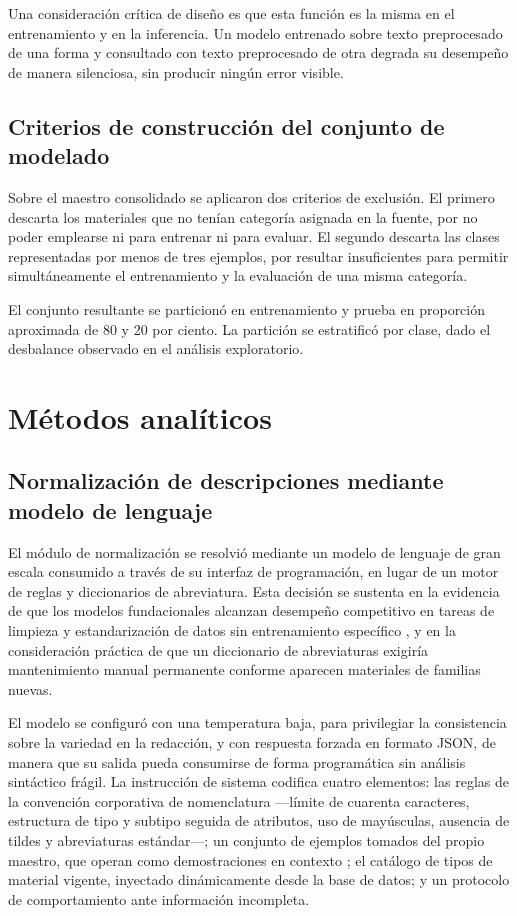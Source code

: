 Una consideración crítica de diseño es que esta función es la misma en el entrenamiento y en la inferencia. Un modelo entrenado sobre texto preprocesado de una forma y consultado con texto preprocesado de otra degrada su desempeño de manera silenciosa, sin producir ningún error visible.

\subsection{Criterios de construcción del conjunto de modelado}
Sobre el maestro consolidado se aplicaron dos criterios de exclusión. El primero descarta los materiales que no tenían categoría asignada en la fuente, por no poder emplearse ni para entrenar ni para evaluar. El segundo descarta las clases representadas por menos de tres ejemplos, por resultar insuficientes para permitir simultáneamente el entrenamiento y la evaluación de una misma categoría.

El conjunto resultante se particionó en entrenamiento y prueba en proporción aproximada de 80 y 20 por ciento. La partición se estratificó por clase, dado el desbalance observado en el análisis exploratorio.

\section{Métodos analíticos}

\subsection{Normalización de descripciones mediante modelo de lenguaje}
El módulo de normalización se resolvió mediante un modelo de lenguaje de gran escala consumido a través de su interfaz de programación, en lugar de un motor de reglas y diccionarios de abreviatura. Esta decisión se sustenta en la evidencia de que los modelos fundacionales alcanzan desempeño competitivo en tareas de limpieza y estandarización de datos sin entrenamiento específico \cite{narayan2022}, y en la consideración práctica de que un diccionario de abreviaturas exigiría mantenimiento manual permanente conforme aparecen materiales de familias nuevas.

El modelo se configuró con una temperatura baja, para privilegiar la consistencia sobre la variedad en la redacción, y con respuesta forzada en formato JSON, de manera que su salida pueda consumirse de forma programática sin análisis sintáctico frágil. La instrucción de sistema codifica cuatro elementos: las reglas de la convención corporativa de nomenclatura —límite de cuarenta caracteres, estructura de tipo y subtipo seguida de atributos, uso de mayúsculas, ausencia de tildes y abreviaturas estándar—; un conjunto de ejemplos tomados del propio maestro, que operan como demostraciones en contexto \cite{brown2020}; el catálogo de tipos de material vigente, inyectado dinámicamente desde la base de datos; y un protocolo de comportamiento ante información incompleta.

